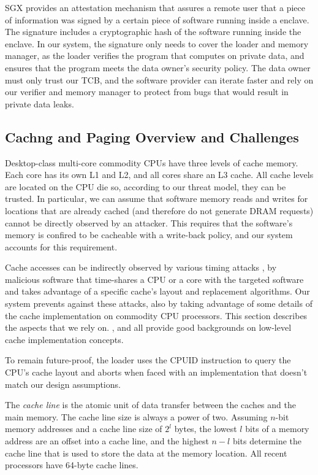 SGX provides an attestation mechanism that assures a remote user that a piece
of information was signed by a certain piece of software running inside a
enclave. The signature includes a cryptographic hash of the software running
inside the enclave. In our system, the signature only needs to cover the loader
and memory manager, as the loader verifies the program that computes on
private data, and ensures that the program meets the data owner's security
policy. The data owner must only trust our TCB, and the software provider can
iterate faster and rely on our verifier and memory manager to protect from
bugs that would result in private data leaks.


\subsection{Cachng and Paging Overview and Challenges}

Desktop-class multi-core commodity CPUs have three levels of cache memory. Each
core has its own L1 and L2, and all cores share an L3 cache. All cache levels
are located on the CPU die so, according to our threat model, they can be
trusted. In particular, we can assume that software memory reads and writes for
locations that are already cached (and therefore do not generate DRAM requests)
cannot be directly observed by an attacker. This requires that the software's
memory is confired to be cacheable with a write-back policy, and our system
accounts for this requirement.

Cache accesses can be indirectly observed by various timing attacks
\cite{banescu2011cache}, by malicious software that time-shares a CPU or a core
with the targeted software and takes advantage of a specific cache's layout
and replacement algorithms. Our system prevents against these attacks, also by
taking advantage of some details of the cache implementation on commodity CPU
processors. This section describes the aspects that we rely on.
\cite{smith1982cache}, \cite{patterson2013architecture} and
\cite{hennessy2012architecture} all provide good backgrounds on low-level cache
implementation concepts.

To remain future-proof, the loader uses the CPUID instruction
\cite{intel2013manual} to query the CPU's cache layout and aborts when faced
with an implementation that doesn't match our design assumptions.

The \textit{cache line} is the atomic unit of data transfer between the caches
and the main memory. The cache line size is always a power of two. Assuming
$n$-bit memory addresses and a cache line size of $2^{l}$ bytes, the lowest
$l$ bits of a memory address are an offset into a cache line, and the highest
$n - l$ bits determine the cache line that is used to store the data at the
memory location. All recent processors have 64-byte cache lines.

